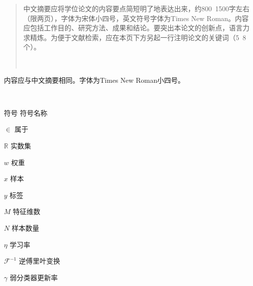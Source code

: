 \begin{abstract}
    \par\setlength\parindent{2em}
    中文摘要应将学位论文的内容要点简短明了地表达出来，约800~1500字左右（限两页），字体为宋体小四号，英文符号字体为Times New Roman。内容应包括工作目的、研究方法、成果和结论。要突出本论文的创新点，语言力求精炼。为便于文献检索，应在本页下方另起一行注明论文的关键词（5~8个）。

     \\
\end{abstract}

\begin{englishabstract}
    \par\setlength\parindent{2em}
    内容应与中文摘要相同。字体为Times New Roman小四号。

     \\

\end{englishabstract}


\XDUpremainmatter

\begin{symbollist}
    \item [符号] \hspace{12em} {符号名称}
    \item [$\in$]\hspace{12.5em} {属于}
    \item [$\mathbb{R}$]\hspace{12.5em} {实数集}
    \item [$w$] \hspace{12.5em} {权重}
    \item [$x$] \hspace{12.5em} {样本}
    \item [$y$] \hspace{12.5em} {标签}
    \item [$M$] \hspace{12.5em} {特征维数}
    \item [$N$] \hspace{12.5em} {样本数量}
    \item [$\eta$] \hspace{12.5em} {学习率}
    \item [$\mathcal{F}^{-1}$] \hspace{12.5em} {逆傅里叶变换}
    \item [$\gamma$] \hspace{12.5em} {弱分类器更新率}
\end{symbollist}

